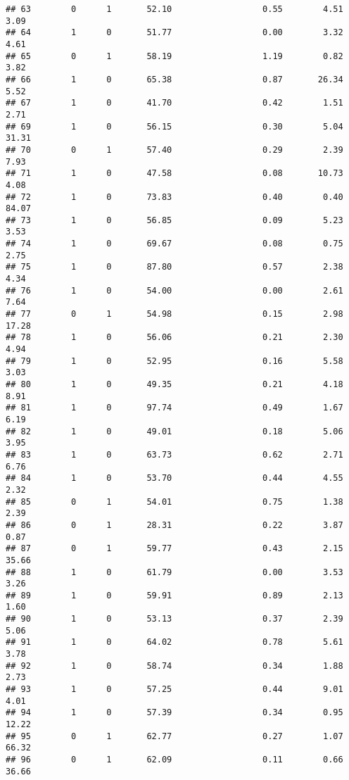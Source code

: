 \documentclass[
]{article}
\begin{document}
\begin{verbatim}
## 63        0      1       52.10                  0.55        4.51        3.09
## 64        1      0       51.77                  0.00        3.32        4.61
## 65        0      1       58.19                  1.19        0.82        3.82
## 66        1      0       65.38                  0.87       26.34        5.52
## 67        1      0       41.70                  0.42        1.51        2.71
## 69        1      0       56.15                  0.30        5.04       31.31
## 70        0      1       57.40                  0.29        2.39        7.93
## 71        1      0       47.58                  0.08       10.73        4.08
## 72        1      0       73.83                  0.40        0.40       84.07
## 73        1      0       56.85                  0.09        5.23        3.53
## 74        1      0       69.67                  0.08        0.75        2.75
## 75        1      0       87.80                  0.57        2.38        4.34
## 76        1      0       54.00                  0.00        2.61        7.64
## 77        0      1       54.98                  0.15        2.98       17.28
## 78        1      0       56.06                  0.21        2.30        4.94
## 79        1      0       52.95                  0.16        5.58        3.03
## 80        1      0       49.35                  0.21        4.18        8.91
## 81        1      0       97.74                  0.49        1.67        6.19
## 82        1      0       49.01                  0.18        5.06        3.95
## 83        1      0       63.73                  0.62        2.71        6.76
## 84        1      0       53.70                  0.44        4.55        2.32
## 85        0      1       54.01                  0.75        1.38        2.39
## 86        0      1       28.31                  0.22        3.87        0.87
## 87        0      1       59.77                  0.43        2.15       35.66
## 88        1      0       61.79                  0.00        3.53        3.26
## 89        1      0       59.91                  0.89        2.13        1.60
## 90        1      0       53.13                  0.37        2.39        5.06
## 91        1      0       64.02                  0.78        5.61        3.78
## 92        1      0       58.74                  0.34        1.88        2.73
## 93        1      0       57.25                  0.44        9.01        4.01
## 94        1      0       57.39                  0.34        0.95       12.22
## 95        0      1       62.77                  0.27        1.07       66.32
## 96        0      1       62.09                  0.11        0.66       36.66

\end{verbatim}
\end{document}
